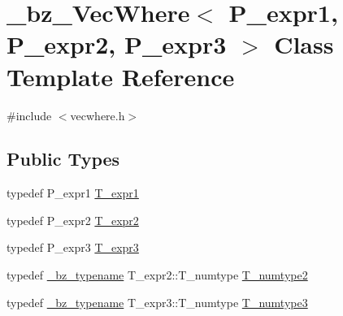 \hypertarget{class__bz__VecWhere}{}\section{\+\_\+bz\+\_\+\+Vec\+Where$<$ P\+\_\+expr1, P\+\_\+expr2, P\+\_\+expr3 $>$ Class Template Reference}
\label{class__bz__VecWhere}


{\ttfamily \#include $<$vecwhere.\+h$>$}

\subsection*{Public Types}
\begin{DoxyCompactItemize}
\item 
typedef P\+\_\+expr1 \hyperlink{class__bz__VecWhere_a1be44d6fc5a189edccb63d669a39d911}{T\+\_\+expr1}
\item 
typedef P\+\_\+expr2 \hyperlink{class__bz__VecWhere_af11819044d65ec1172e5f5bff5925dea}{T\+\_\+expr2}
\item 
typedef P\+\_\+expr3 \hyperlink{class__bz__VecWhere_add1351585098ebec2a48f1b6fbe18761}{T\+\_\+expr3}
\item 
typedef \hyperlink{compiler_8h_a1bc40add3e72effc9cf69dbe445cbdfd}{\+\_\+bz\+\_\+typename} T\+\_\+expr2\+::\+T\+\_\+numtype \hyperlink{class__bz__VecWhere_a82e31f20b77e9657a8cb8ab4d20e9ba7}{T\+\_\+numtype2}
\item 
typedef \hyperlink{compiler_8h_a1bc40add3e72effc9cf69dbe445cbdfd}{\+\_\+bz\+\_\+typename} T\+\_\+expr3\+::\+T\+\_\+numtype \hyperlink{class__bz__VecWhere_a7e0fa3a4525aa350c436e97d0e131394}{T\+\_\+numtype3}
\end{DoxyCompactItemize}
